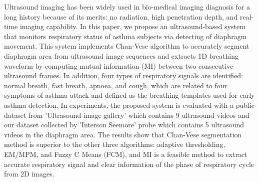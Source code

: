 Ultrasound imaging has been widely used in bio-medical imaging diagnosis for a long history because of its merits: no radiation, high penetration depth, and real-time imaging capability. In this paper, we propose an ultrasound-based system that monitors respiratory status of asthma subjects via detecting of diaphragm movement. This system implements Chan-Vese algorithm to accurately segment diaphragm area from ultrasound image sequences and extracts 1D breathing waveform by computing mutual information (MI) between two consecutive ultrasound frames. In addition, four types of respiratory signals are identified: normal breath, fast breath, apnoea, and cough, which are related to four symptoms of asthma attack and defined as the breathing templates used for early asthma detection. In experiments, the proposed system is evaluated with a public dataset from 'Ultrasound image gallery' which contains 9 ultrasound videos and our dataset collected by 'Interson Seemore' probe which contains 5 ultrasound videos in the diaphragm area. The results show that Chan-Vese segmentation method is superior to the other three algorithms: adaptive thresholding, EM/MPM, and Fuzzy C Means (FCM), and MI is a feasible method to extract accurate respiratory signal and clear information of the phase of respiratory cycle from 2D images.
